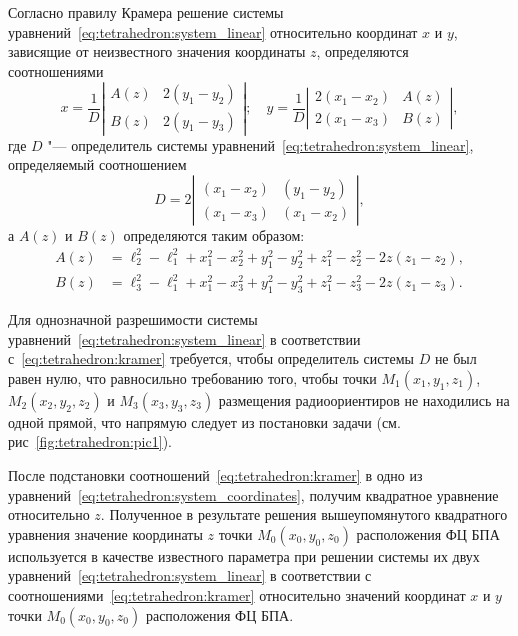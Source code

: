 \documentclass[../main.tex]{subfiles}
\begin{document}
Согласно правилу Крамера решение системы уравнений~\eqref{eq:tetrahedron:system_linear} относительно координат $x$ и $y$, зависящие от неизвестного значения координаты $z$, определяются соотношениями~\cite{TYRTISHNOKOV:2007}
\begin{equation}\label{eq:tetrahedron:kramer}
  x = \frac{1}{D}\left| \begin{matrix}
    A\left(z\right) & 2 \left(y_1 - y_2\right) \\
    B\left(z\right) & 2 \left(y_1 - y_3\right)
  \end{matrix}\right|;\quad
  y = \frac{1}{D}\left| \begin{matrix}
    2\left(x_1 - x_2\right) & A\left(z\right) \\
    2\left(x_1 - x_3\right) & B\left(z\right)
  \end{matrix}\right|,
\end{equation}
где $D$ "--- определитель системы уравнений~\eqref{eq:tetrahedron:system_linear}, определяемый соотношением
\begin{equation*}
  D = 2 \left|\begin{matrix}
    \left(x_1 - x_2\right) & \left(y_1 - y_2\right) \\
    \left(x_1 - x_3\right) & \left(x_1 - x_2\right)
  \end{matrix}\right|,
\end{equation*}
а $A\left(z\right)$ и $B\left(z\right)$ определяются таким образом:
\begin{align*}
  A\left(z\right) &= \ell_2^2 - \ell_1^2 + x_1^2 - x_2^2 + y_1^2 - y_2^2 + z_1^2 - z_2^2 - 2z\left(z_1 - z_2\right), \\
  B\left(z\right) &= \ell_3^2 - \ell_1^2 + x_1^2 - x_3^2 + y_1^2 - y_3^2 + z_1^2 - z_3^2 - 2z\left(z_1 - z_3\right).
\end{align*}

Для однозначной разрешимости системы уравнений~\eqref{eq:tetrahedron:system_linear} в соответствии с~\eqref{eq:tetrahedron:kramer} требуется, чтобы определитель системы $D$ не был равен нулю, что равносильно требованию того, чтобы точки $M_1\left(x_1, y_1, z_1\right)$, $M_2\left(x_2, y_2, z_2\right)$ и $M_3\left(x_3, y_3, z_3\right)$ размещения радиоориентиров не находились на одной прямой, что напрямую следует из постановки задачи (см. рис~\ref{fig:tetrahedron:pic1}).

После подстановки соотношений~\eqref{eq:tetrahedron:kramer} в одно из уравнений~\eqref{eq:tetrahedron:system_coordinates}, получим квадратное уравнение относительно $z$. Полученное в результате решения вышеупомянутого квадратного уравнения значение координаты $z$ точки $M_0\left(x_0, y_0, z_0\right)$ расположения ФЦ БПА используется в качестве известного параметра при решении системы их двух уравнений~\eqref{eq:tetrahedron:system_linear} в соответствии с соотношениями~\eqref{eq:tetrahedron:kramer} относительно значений координат $x$ и $y$ точки $M_0\left(x_0, y_0, z_0\right)$ расположения ФЦ БПА.
\end{document}
